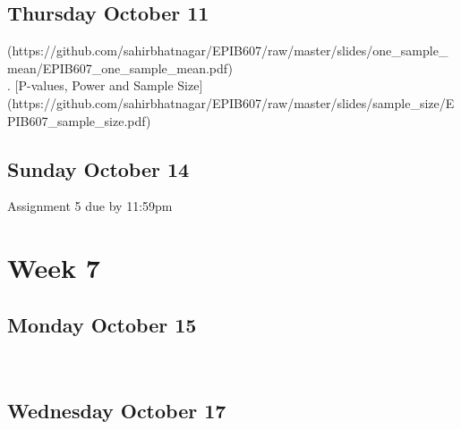 \documentclass[]{book}
\let\originaltabular\tabular
\let\endoriginaltabular\endtabular
\renewenvironment{tabular}[1]{%
  \begingroup%
  \centering%
  \originaltabular{#1}}%
  {\endoriginaltabular\endgroup}
\theoremstyle{definition}
\theoremstyle{definition}
\theoremstyle{definition}
\theoremstyle{remark}
\begin{document}
\subsection{Thursday October 11}\label{thursday-october-11}

\begin{table}[H]
\centering
\begin{tabular}{l}
(https://github.com/sahirbhatnagar/EPIB607/raw/master/slides/one\_sample\_mean/EPIB607\_one\_sample\_mean.pdf)\\
. [P-values, Power and Sample Size](https://github.com/sahirbhatnagar/EPIB607/raw/master/slides/sample\_size/EPIB607\_sample\_size.pdf)\\
\hline
\end{tabular}
\end{table}

\subsection{Sunday October 14}\label{sunday-october-14}

\begin{table}[H]
\centering
\begin{tabular}{l}
\hline
Assignment 5 due by 11:59pm\\
\hline
\end{tabular}
\end{table}

\section{Week 7}\label{week-7}

\subsection{Monday October 15}\label{monday-october-15}

\begin{table}[H]
\centering
\begin{tabular}{l}
\hline
\\
\hline
\end{tabular}
\end{table}

\subsection{Wednesday October 17}\label{wednesday-october-17}
\end{document}
